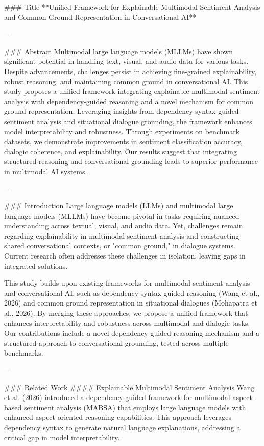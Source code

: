 ### Title
**Unified Framework for Explainable Multimodal Sentiment Analysis and Common Ground Representation in Conversational AI**

---

### Abstract
Multimodal large language models (MLLMs) have shown significant potential in handling text, visual, and audio data for various tasks. Despite advancements, challenges persist in achieving fine-grained explainability, robust reasoning, and maintaining common ground in conversational AI. This study proposes a unified framework integrating explainable multimodal sentiment analysis with dependency-guided reasoning and a novel mechanism for common ground representation. Leveraging insights from dependency-syntax-guided sentiment analysis and situational dialogue grounding, the framework enhances model interpretability and robustness. Through experiments on benchmark datasets, we demonstrate improvements in sentiment classification accuracy, dialogic coherence, and explainability. Our results suggest that integrating structured reasoning and conversational grounding leads to superior performance in multimodal AI systems.

---

### Introduction
Large language models (LLMs) and multimodal large language models (MLLMs) have become pivotal in tasks requiring nuanced understanding across textual, visual, and audio data. Yet, challenges remain regarding explainability in multimodal sentiment analysis and constructing shared conversational contexts, or "common ground," in dialogue systems. Current research often addresses these challenges in isolation, leaving gaps in integrated solutions.

This study builds upon existing frameworks for multimodal sentiment analysis and conversational AI, such as dependency-syntax-guided reasoning (Wang et al., 2026) and common ground representation in situational dialogues (Mohapatra et al., 2026). By merging these approaches, we propose a unified framework that enhances interpretability and robustness across multimodal and dialogic tasks. Our contributions include a novel dependency-guided reasoning mechanism and a structured approach to conversational grounding, tested across multiple benchmarks.

---

### Related Work
#### Explainable Multimodal Sentiment Analysis
Wang et al. (2026) introduced a dependency-guided framework for multimodal aspect-based sentiment analysis (MABSA) that employs large language models with enhanced aspect-oriented reasoning capabilities. This approach leverages dependency syntax to generate natural language explanations, addressing a critical gap in model interpretability.

